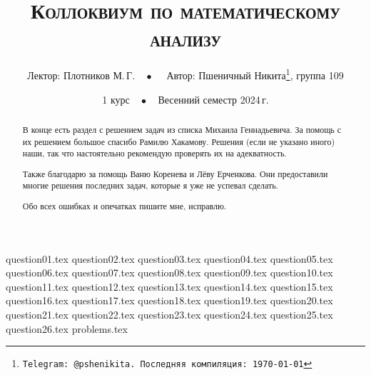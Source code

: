 \documentclass[a4paper, 11pt]{article}
\begin{document}
\title{\bfseries\scshape Коллоквиум по математическому анализу}
\date{1 курс$\quad\bullet\quad$Весенний семестр 2024\,г.}
\author{Лектор: Плотников М.\,Г.$\quad\bullet\quad$ Автор: Пшеничный Никита\thanks{\texttt{Telegram: @pshenikita. Последняя компиляция: \today}}, группа 109}

\maketitle

\begin{abstract}
    В конце есть раздел с решением задач из списка Михаила Геннадьевича. За помощь с их решением большое спасибо Рамилю Хакамову. Решения (если не указано иного) наши, так что настоятельно рекомендую проверять их на адекватность.

    Также благодарю за помощь Ваню Коренева и Лёву Ерченкова. Они предоставили многие решения последних задач, которые я уже не успевал сделать.

    Обо всех ошибках и опечатках пишите мне, исправлю.
\end{abstract}

\tableofcontents

\newpage

{question01.tex}
{question02.tex}
{question03.tex}
{question04.tex}
{question05.tex}
{question06.tex}
{question07.tex}
{question08.tex}
{question09.tex}
{question10.tex}
{question11.tex}
{question12.tex}
{question13.tex}
{question14.tex}
{question15.tex}
{question16.tex}
{question17.tex}
{question18.tex}
{question19.tex}
{question20.tex}
{question21.tex}
{question22.tex}
{question23.tex}
{question24.tex}
{question25.tex}
{question26.tex}
{problems.tex}
\end{document}
